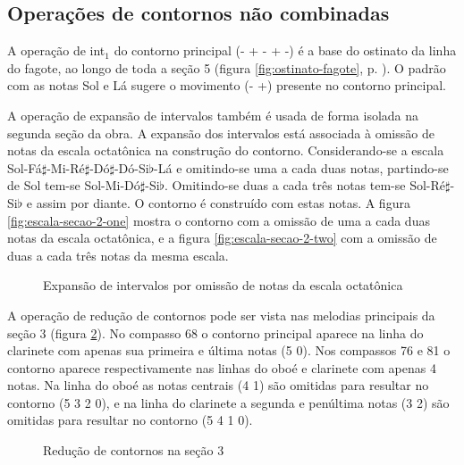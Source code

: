 \subsection{Operações de contornos não combinadas}
\label{sec:cont-nao-comb}

A operação de int$_1$ do contorno principal (- + - + -) é a base do
ostinato da linha do fagote, ao longo de toda a seção 5 (figura
\ref{fig:ostinato-fagote}, p. \pageref{fig:ostinato-fagote}). O padrão
com as notas Sol e Lá sugere o movimento (- +) presente no contorno
principal.

A operação de expansão de intervalos também é usada de forma isolada
na segunda seção da obra. A expansão dos intervalos está associada à
omissão de notas da escala octatônica na construção do
contorno. Considerando-se a escala
Sol-Fá$\sharp$-Mi-Ré$\sharp$-Dó$\sharp$-Dó-Si$\flat$-Lá e omitindo-se
uma a cada duas notas, partindo-se de Sol tem-se
Sol-Mi-Dó$\sharp$-Si$\flat$. Omitindo-se duas a cada três notas tem-se
Sol-Ré$\sharp$-Si$\flat$ e assim por diante. O contorno é construído
com estas notas. A figura \ref{fig:escala-secao-2-one} mostra o
contorno com a omissão de uma a cada duas notas da escala octatônica,
e a figura \ref{fig:escala-secao-2-two} com a omissão de duas a cada
três notas da mesma escala.

\begin{figure}
  \centering

  \caption{Expansão de intervalos por omissão de notas da escala
    octatônica}
  \label{fig:escala-secao-2}
\end{figure}

A operação de redução de contornos pode ser vista nas melodias
principais da seção 3 (figura \ref{fig:reducao-contornos-secao-3}). No
compasso 68 o contorno principal \contpr{} aparece na linha do
clarinete com apenas sua primeira e última notas (5 0). Nos compassos
76 e 81 o contorno aparece respectivamente nas linhas do oboé e
clarinete com apenas 4 notas. Na linha do oboé as notas centrais (4 1)
são omitidas para resultar no contorno (5 3 2 0), e na linha do
clarinete a segunda e penúltima notas (3 2) são omitidas para resultar
no contorno (5 4 1 0).

\begin{figure}
  \centering



  \caption{Redução de contornos na seção 3}
  \label{fig:reducao-contornos-secao-3}
\end{figure}


